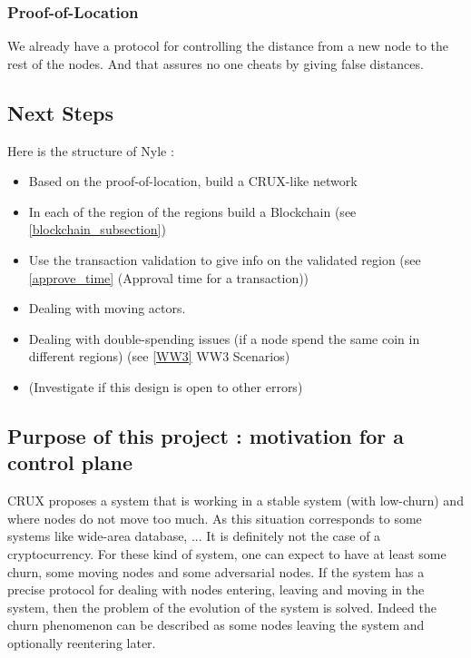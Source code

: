 \documentclass[a4paper,11pt,oneside]{report}
\begin{document}
\subsubsection{Proof-of-Location} We already have a protocol for controlling
the distance from a new node to the rest of the nodes. And that assures no one
cheats by giving false distances. 

\subsection{Next Steps} Here is the structure of Nyle :

\begin{itemize} 
\item Based on the proof-of-location, build a CRUX-like network
\item In each of the region of the regions build a Blockchain 
(see \ref{blockchain_subsection})
\item Use the transaction validation to  give info on the validated region
(see \ref{approve_time} (Approval time for a transaction))
\item Dealing with moving actors.
\item Dealing with double-spending issues
(if a node spend the same coin in different regions) 
(see \ref{WW3} WW3 Scenarios) 
\item (Investigate if this design is open to other errors)
\end{itemize}

\subsection{Purpose of this project : motivation for a control plane}

CRUX proposes a system that is working in a stable system (with low-churn) and
where nodes do not move too much. As this situation corresponds to some
systems like wide-area database, ... It is definitely not the case of a
cryptocurrency.  For these kind of system, one can expect to have at least some
churn, some moving nodes and some adversarial nodes.  If the system has a
precise protocol for dealing with nodes entering, leaving and moving in the
system, then the problem of the evolution of the system is solved. Indeed the
churn phenomenon can be described as some nodes leaving the system and
optionally reentering later. 
\end{document}
